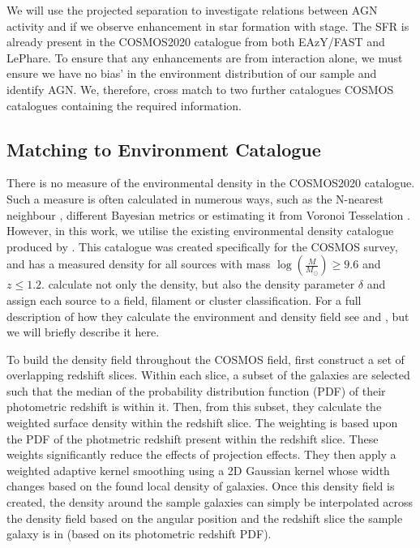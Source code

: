 \documentclass[fleqn,usenatbib]{mnras}
\begin{document}
We will use the projected separation to investigate relations between AGN activity and if we observe enhancement in star formation with stage. The SFR is already present in the COSMOS2020 catalogue from both EAzY/FAST and LePhare. To ensure that any enhancements are from interaction alone, we must ensure we have no bias' in the environment distribution of our sample and identify AGN. We, therefore, cross match to two further catalogues COSMOS catalogues containing the required information.

\subsection{Matching to Environment Catalogue}\label{data:environ}
\noindent There is no measure of the environmental density in the COSMOS2020 catalogue. Such a measure is often calculated in numerous ways, such as the N-nearest neighbour \citep{2006MNRAS.373..469B}, different Bayesian metrics \citep{2008ApJ...674L..13C} or estimating it from Voronoi Tesselation \citep{2021inas.book...57V}. However, in this work, we utilise the existing environmental density catalogue produced by \citet{2017ApJ...837...16D}. This catalogue was created specifically for the COSMOS survey, and has a measured density for all sources with mass $\log(\frac{M}{M_\odot}) \geq 9.6$ and $z \leq 1.2$. \citet{2017ApJ...837...16D} calculate not only the density, but also the density parameter $\delta$ and assign each source to a field, filament or cluster classification. For a full description of how they calculate the environment and density field see \citet{2015ApJ...805..121D} and \citet{2017ApJ...837...16D}, but we will briefly describe it here.

To build the density field throughout the COSMOS field, \citet{2017ApJ...837...16D} first construct a set of overlapping redshift slices. Within each slice, a subset of the galaxies are selected such that the median of the probability distribution function (PDF) of their photometric redshift is within it. Then, from this subset, they calculate the weighted surface density within the redshift slice. The weighting is based upon the PDF of the photmetric redshift present within the redshift slice. These weights significantly reduce the effects of projection effects. They then apply a weighted adaptive kernel smoothing using a 2D Gaussian kernel whose width changes based on the found local density of galaxies. Once this density field is created, the density around the sample galaxies can simply be interpolated across the density field based on the angular position and the redshift slice the sample galaxy is in (based on its photometric redshift PDF).
\end{document}
